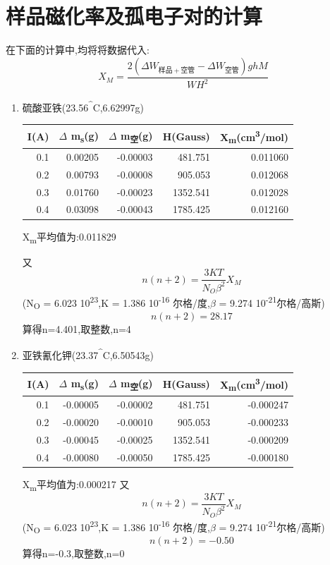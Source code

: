 \documentclass[11pt]{report}
\begin{document}
\section{样品磁化率及孤电子对的计算}
\label{sec:org1e524dc}
在下面的计算中,均将将数据代入:
\[
    X_{M}=\frac{2(\Delta W_{样品+空管}-\Delta W_{空管})ghM}{WH^{2}}
    \]
\begin{enumerate}
\item 硫酸亚铁(23.56\textsuperscript{\^{}}C,6.62997g)
\label{sec:org9b0597a}
\begin{center}
\begin{tabular}{rrrrr}
I(A) & \(\Delta\) m\textsubscript{s}(g) & \(\Delta\) m\textsubscript{空}(g) & H(Gauss) & X\textsubscript{m}(cm\textsuperscript{3}/mol)\\
\hline
0.1 & 0.00205 & -0.00003 & 481.751 & 0.011060\\
0.2 & 0.00793 & -0.00008 & 905.053 & 0.012068\\
0.3 & 0.01760 & -0.00023 & 1352.541 & 0.012028\\
0.4 & 0.03098 & -0.00043 & 1785.425 & 0.012160\\
\end{tabular}
\end{center}
X\textsubscript{m}平均值为:0.011829

又
\[
n(n+2)=\frac{3KT}{N_{O}\beta^{2}}X_{M}
\]
(N\textsubscript{O} = 6.023\texttimes{} 10\textsuperscript{23},K = 1.386\texttimes{} 10\textsuperscript{-16} 尔格/度,\(\beta\) = 9.274\texttimes{} 10\textsuperscript{-21}尔格/高斯)
\[
n(n+2)=28.17
\]
算得n=4.401,取整数,n=4

\item 亚铁氰化钾(23.37\textsuperscript{\^{}}C,6.50543g)
\label{sec:org10db2f7}
\begin{center}
\begin{tabular}{rrrrr}
I(A) & \(\Delta\) m\textsubscript{s}(g) & \(\Delta\) m\textsubscript{空}(g) & H(Gauss) & X\textsubscript{m}(cm\textsuperscript{3}/mol)\\
\hline
0.1 & -0.00005 & -0.00002 & 481.751 & -0.000247\\
0.2 & -0.00020 & -0.00010 & 905.053 & -0.000233\\
0.3 & -0.00045 & -0.00025 & 1352.541 & -0.000209\\
0.4 & -0.00080 & -0.00050 & 1785.425 & -0.000180\\
\end{tabular}
\end{center}
X\textsubscript{m}平均值为:0.000217
又
\[
n(n+2)=\frac{3KT}{N_{O}\beta^{2}}X_{M}
\]
(N\textsubscript{O} = 6.023\texttimes{} 10\textsuperscript{23},K = 1.386\texttimes{} 10\textsuperscript{-16} 尔格/度,\(\beta\) = 9.274\texttimes{} 10\textsuperscript{-21}尔格/高斯)
\[
n(n+2)=-0.50
\]
算得n=-0.3,取整数,n=0
\end{enumerate}
\end{document}
